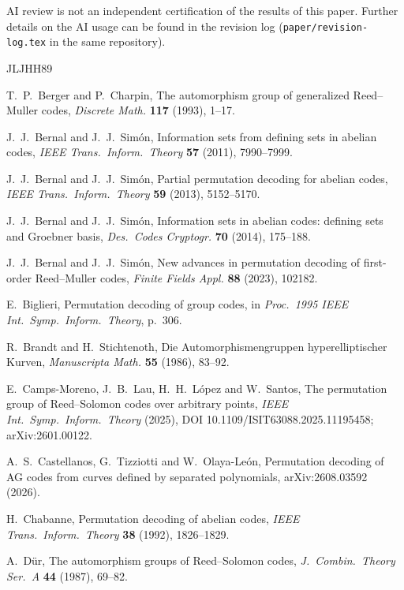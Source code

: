 \documentclass[12pt,letterpaper]{article}
\theoremstyle{definition}
\theoremstyle{remark}
\numberwithin{equation}{section}
\begin{document}
AI review is not an independent certification of the results of this
paper. Further details on the AI usage can be found in the revision log
(\texttt{paper/revision-log.tex} in the same repository).

\begin{thebibliography}{JLJHH89}\small

 T.~P.~Berger and P.~Charpin, The automorphism group
of generalized Reed--Muller codes, \emph{Discrete Math.} \textbf{117}
(1993), 1--17.

 J.~J.~Bernal and J.~J.~Sim\'on, Information sets
from defining sets in abelian codes, \emph{IEEE Trans.\ Inform.\ Theory}
\textbf{57} (2011), 7990--7999.

 J.~J.~Bernal and J.~J.~Sim\'on, Partial permutation
decoding for abelian codes, \emph{IEEE Trans.\ Inform.\ Theory}
\textbf{59} (2013), 5152--5170.

 J.~J.~Bernal and J.~J.~Sim\'on, Information sets in
abelian codes: defining sets and Groebner basis, \emph{Des.\ Codes
Cryptogr.} \textbf{70} (2014), 175--188.

 J.~J.~Bernal and J.~J.~Sim\'on, New advances in
permutation decoding of first-order Reed--Muller codes, \emph{Finite
Fields Appl.} \textbf{88} (2023), 102182.

 E.~Biglieri, Permutation decoding of group codes,
in \emph{Proc.\ 1995 IEEE Int.\ Symp.\ Inform.\ Theory}, p.~306.

 R.~Brandt and H.~Stichtenoth, Die
Automorphismengruppen hyperelliptischer Kurven, \emph{Manuscripta Math.}
\textbf{55} (1986), 83--92.

 E.~Camps-Moreno, J.~B.~Lau, H.~H.~L\'opez and
W.~Santos, The permutation group of Reed--Solomon codes over arbitrary
points, \emph{IEEE Int.\ Symp.\ Inform.\ Theory} (2025),
DOI 10.1109/ISIT63088.2025.11195458; arXiv:2601.00122.

 A.~S.~Castellanos, G.~Tizziotti and
W.~Olaya-Le\'on, Permutation decoding of AG codes from curves defined by
separated polynomials, arXiv:2608.03592 (2026).

 H.~Chabanne, Permutation decoding of abelian codes,
\emph{IEEE Trans.\ Inform.\ Theory} \textbf{38} (1992), 1826--1829.

 A.~D\"ur, The automorphism groups of
Reed--Solomon codes, \emph{J.\ Combin.\ Theory Ser.~A} \textbf{44}
(1987), 69--82.


\end{thebibliography}
\end{document}
